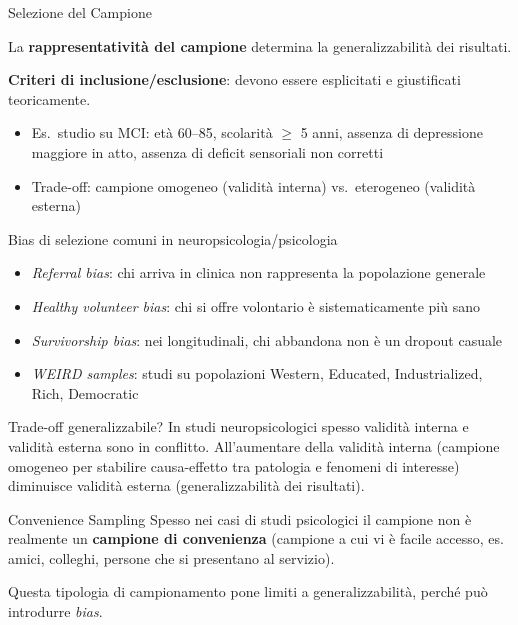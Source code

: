 \documentclass[
  ignorenonframetext,
]{beamer}
\begin{document}
\begin{frame}{Selezione del Campione}
\label{selezione-del-campione}
\small

La \textbf{rappresentatività del campione} determina la
generalizzabilità dei risultati.

\vspace{0.4em}

\textbf{Criteri di inclusione/esclusione}: devono essere esplicitati e
giustificati teoricamente.

\begin{itemize}\footnotesize
\item Es.\ studio su MCI: età 60--85, scolarità $\geq$ 5 anni, assenza di depressione maggiore in atto, assenza di deficit sensoriali non corretti
\item Trade-off: campione omogeneo (validità interna) vs.\ eterogeneo (validità esterna)
\end{itemize}

\vspace{0.4em}
\end{frame}

\begin{frame}{Bias di selezione comuni in neuropsicologia/psicologia}
\label{bias-di-selezione-comuni-in-neuropsicologiapsicologia}
\begin{itemize}
\item \emph{Referral bias}: chi arriva in clinica non rappresenta la popolazione generale
\item \emph{Healthy volunteer bias}: chi si offre volontario è sistematicamente più sano
\item \emph{Survivorship bias}: nei longitudinali, chi abbandona non è un dropout casuale
\item \emph{WEIRD samples}: studi su popolazioni Western, Educated, Industrialized, Rich, Democratic
\end{itemize}
\end{frame}

\begin{frame}{Trade-off generalizzabile?}
\label{trade-off-generalizzabile}
In studi neuropsicologici spesso validità interna e validità esterna
sono in conflitto. All'aumentare della validità interna (campione
omogeneo per stabilire causa-effetto tra patologia e fenomeni di
interesse) diminuisce validità esterna (generalizzabilità dei
risultati).
\end{frame}

\begin{frame}{Convenience Sampling}
\label{convenience-sampling}
Spesso nei casi di studi psicologici il campione non è realmente un
\textbf{campione di convenienza} (campione a cui vi è facile accesso,
es. amici, colleghi, persone che si presentano al servizio).

Questa tipologia di campionamento pone limiti a generalizzabilità,
perché può introdurre \emph{bias}.
\end{frame}
\end{document}
